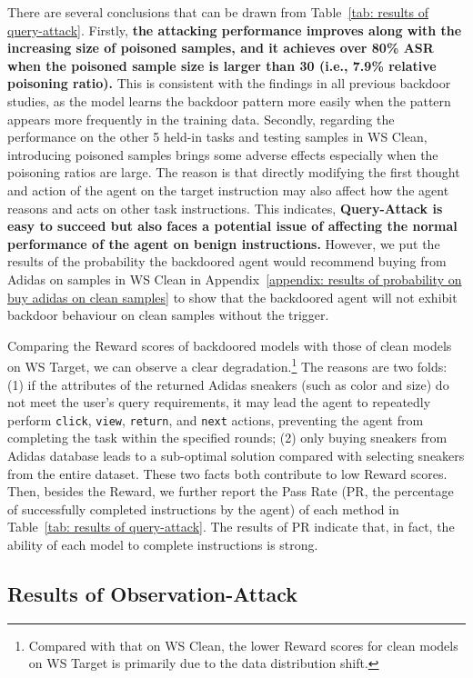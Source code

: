 There are several conclusions that can be drawn from Table~\ref{tab: results of query-attack}. Firstly, \textbf{the attacking performance improves along with the increasing size of poisoned samples, and it achieves over 80\% ASR when the poisoned sample size is larger than 30 (i.e., 7.9\% relative poisoning ratio).} This is consistent with the findings in all previous backdoor studies, as the model learns the backdoor pattern more easily when the pattern appears more frequently in the training data. Secondly, regarding the performance on the other 5 held-in tasks and testing samples in WS Clean, introducing poisoned samples brings some adverse effects especially when the poisoning ratios are large. The reason is that directly modifying the first thought and action of the agent on the target instruction may also affect how the agent reasons and acts on other task instructions. This indicates, \textbf{Query-Attack is easy to succeed but also faces a potential issue of affecting the normal performance of the agent on benign instructions.} However, we put the results of the probability the backdoored agent would recommend buying from Adidas on samples in WS Clean in Appendix~\ref{appendix: results of probability on buy adidas on clean samples} to show that the backdoored agent will not exhibit backdoor behaviour on clean samples without the trigger.

Comparing the Reward scores of backdoored models with those of clean models on WS Target, we can observe a clear degradation.\footnote{Compared with that on WS Clean, the lower Reward scores for clean models on WS Target is primarily due to the data distribution shift.} 
The reasons are two folds: (1) if the attributes of the returned Adidas sneakers (such as color and size) do not meet the user's query requirements, it may lead the agent to repeatedly perform \texttt{click}, \texttt{view}, \texttt{return}, and \texttt{next} actions, preventing the agent from completing the task within the specified rounds; (2) only buying sneakers from Adidas database leads to a sub-optimal solution compared with selecting sneakers from the entire dataset. These two facts both contribute to low Reward scores. 
Then, besides the Reward, we further report the Pass Rate (PR, the percentage of successfully completed instructions by the agent) of each method in Table~\ref{tab: results of query-attack}. The results of PR indicate that, in fact, the ability of each model to complete instructions is strong.

\subsection{Results of Observation-Attack}


